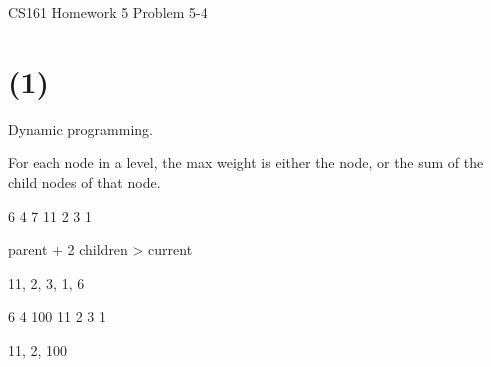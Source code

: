 \documentclass[12pt]{article}
\begin{document}
\begin{center}
{\Large CS161 Homework 5 Problem 5-4}

\end{center}

\section*{(1)}

Dynamic programming.

For each node in a level, the max weight is either the node, or the sum of the child nodes of that node. 

			6
		4 		7
	11	  2   3   1


parent + 2 children > current

11, 2, 3, 1, 6

			6
		4 	   100
	11	  2   3   1

11, 2, 100
\end{document}
